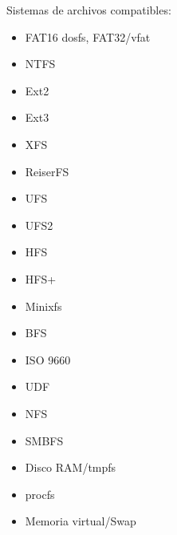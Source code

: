 Sistemas de archivos compatibles:


			\begin{itemize}
				\item FAT16 dosfs, FAT32/vfat	
				\item NTFS	
				\item Ext2	
				\item Ext3	
				\item XFS	
				\item ReiserFS	
				\item UFS	
				\item UFS2	
				\item HFS
				\item HFS+	
				\item Minixfs	
				\item BFS	
				\item ISO 9660	 
				\item UDF	
				\item NFS	
				\item SMBFS	
				\item Disco RAM/tmpfs	
				\item procfs	
				\item Memoria virtual/Swap	
				
			\end{itemize}



			
 			
 